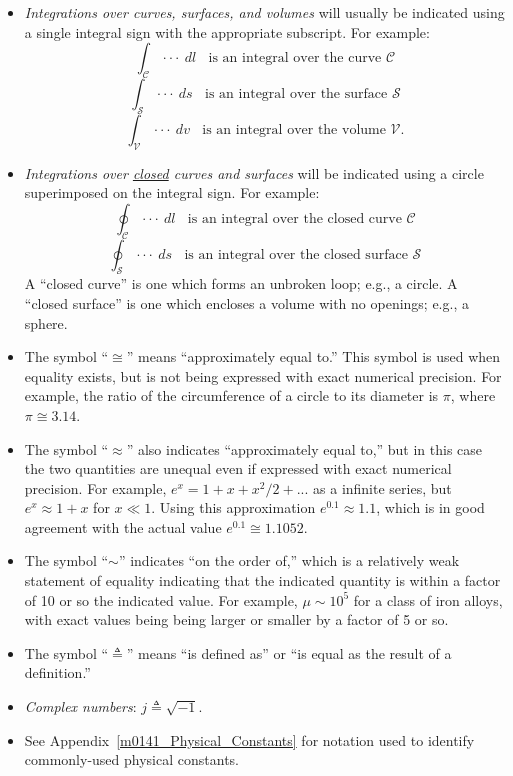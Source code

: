 \begin{itemize}
\item \emph{Integrations over curves, surfaces, and volumes} will usually be indicated using a single integral sign with the appropriate subscript. For example:
$$ \int_{\mathcal{C}} \cdot\cdot\cdot ~dl ~~~~ \mbox{is an integral over the curve $\mathcal{C}$}$$
$$ \int_{\mathcal{S}} \cdot\cdot\cdot ~ds ~~~~ \mbox{is an integral over the surface $\mathcal{S}$}$$  
$$ \int_{\mathcal{V}} \cdot\cdot\cdot ~dv ~~~~ \mbox{is an integral over the volume $\mathcal{V}$.}$$ 
\item \emph{Integrations over \underline{closed} curves and surfaces} will be indicated using a circle superimposed on the integral sign. For example: 
$$ \oint_{\mathcal{C}} \cdot\cdot\cdot ~dl ~~~~ \mbox{is an integral over the closed curve $\mathcal{C}$}$$
$$ \oint_{\mathcal{S}} \cdot\cdot\cdot ~ds ~~~~ \mbox{is an integral over the closed surface $\mathcal{S}$}$$ 
A ``closed curve'' is one which forms an unbroken loop; e.g., a circle.  
A ``closed surface'' is one which encloses a volume with no openings; e.g., a sphere.
\item The symbol ``$\cong$'' means ``approximately equal to.''  This symbol is used when equality exists, but is not being expressed with exact numerical precision.  For example, the ratio of the circumference of a circle to its diameter is $\pi$, where $\pi \cong 3.14$.
\item The symbol ``$\approx$'' also indicates ``approximately equal to,'' but in this case the two quantities are unequal even if expressed with exact numerical precision.  For example, $e^x = 1+x+x^2/2+...$ as a infinite series, but $e^x \approx 1+x$ for $x\ll 1$.  Using this approximation $e^{0.1} \approx 1.1$, which is in good agreement with the actual value $e^{0.1} \cong 1.1052$. 
\item The symbol ``$\sim$'' indicates ``on the order of,'' which is a relatively weak statement of equality indicating that the indicated quantity is within a factor of 10 or so the indicated value.  For example, $\mu\sim10^5$  for a class of iron alloys, with exact values being being larger or smaller by a factor of 5 or so. 
\item The symbol ``$\triangleq$'' means ``is defined as'' or ``is equal as the result of a definition.''  
\item \emph{Complex numbers}: $j\triangleq\sqrt{-1}$.
\item See Appendix~\ref{m0141_Physical_Constants} for notation used to identify commonly-used physical constants.
\end{itemize}

